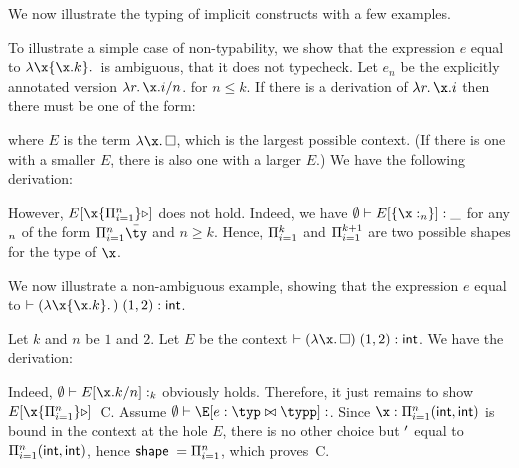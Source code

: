 \documentclass[acmsmall,screen,nonacm]{acmart}
\begin{document}
We now illustrate the typing of implicit constructs with a few examples.
\begin{example}
To illustrate a simple case of non-typability, we show that the expression $e$
equal to $\efun \x {\eproj \x k}$ is ambiguous, \ie that it does not
typecheck.
%
Let $e_n$ be the explicitly annotated version $\efun r
{\eproj[n] \x i}$. for $n \le k$.  If there is a derivation of $\efun r
{\eproj \x i}$ then there must be one of the form:
\begin{mathpar}
\end{mathpar}
where $E$ is the term $\efun \x \ehole$, which is the largest possible
context. (If there is one with a smaller $E$, there is also one with a
larger $E$.)
%
We have  the following derivation:
\begin{mathpar}
\end{mathpar}
However, $\eshape E  \x {\Pi\iton}$ does not hold.
Indeed, we have $\eset \th E \where {\emagic {\x :\t_n}} : \wild$
for any $\t_n$ of the form $\Pi\iton \tys$ and $n \ge k$. 
Hence, $\Pi\iton[k]$ and $\Pi\iton[k+1]$ are two possible shapes
for the type of $\x$. 
\end{example}

\begin{example}
\locallabelreset
We now illustrate a non-ambiguous example, showing that the
expression $e$ equal to $\th \eapp {(\efun \x {\eproj
\x  k})} {(1, 2)} : \tint$.

Let $k$ and $n$ be $1$ and $2$.
Let $E$ be the context $\th \eapp {(\efun \x \ehole)} {(1, 2)} : \tint$.  We
have the derivation:
\begin{mathpar}
\end{mathpar}
Indeed, $\eset \th E \where {\eproj[n] \x k} : \t_k$ obviously holds.
Therefore, it just remains to show $\eshape E \x {\Pi\iton}$~\llabel C.
Assume $\eset \th \E \where{\ecast \x \typ \typp} : \t$. Since
$\x: \Pi\iton (\tint,\tint)$ is bound in the context at the hole $E$,
there is no other choice but $\tp$ equal to $\Pi\iton (\tint,\tint)$,
hence $\tshape \t = \Pi\iton$, which proves~\lref C. 
\end{example}
\end{document}
